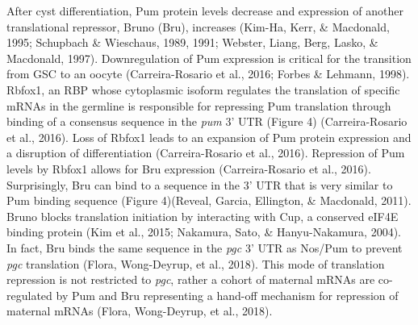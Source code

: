 \documentclass[12pt,oneside]{reedthesis}
\begin{document}
After cyst differentiation, Pum protein levels decrease and expression
of another translational repressor, Bruno (Bru), increases
(Kim-Ha, Kerr, \& Macdonald, 1995; Schupbach \& Wieschaus, 1989, 1991; Webster, Liang, Berg, Lasko, \& Macdonald, 1997). Downregulation of Pum expression is
critical for the transition from GSC to an oocyte
(Carreira-Rosario et al., 2016; Forbes \& Lehmann, 1998). Rbfox1, an RBP whose
cytoplasmic isoform regulates the translation of specific mRNAs in the
germline is responsible for repressing Pum translation through binding
of a consensus sequence in the \emph{pum} 3' UTR (Figure 4)
(Carreira-Rosario et al., 2016). Loss of Rbfox1 leads to an expansion of Pum
protein expression and a disruption of differentiation
(Carreira-Rosario et al., 2016). Repression of Pum levels by Rbfox1 allows
for Bru expression (Carreira-Rosario et al., 2016). Surprisingly, Bru can
bind to a sequence in the 3' UTR that is very similar to Pum binding
sequence (Figure 4)(Reveal, Garcia, Ellington, \& Macdonald, 2011). Bruno blocks translation
initiation by interacting with Cup, a conserved eIF4E binding protein
(Kim et al., 2015; Nakamura, Sato, \& Hanyu-Nakamura, 2004). In fact, Bru binds the same sequence in
the \emph{pgc} 3' UTR as Nos/Pum to prevent \emph{pgc} translation
(Flora, Wong-Deyrup, et al., 2018). This mode of translation repression is not restricted
to \emph{pgc}, rather a cohort of maternal mRNAs are co-regulated by Pum and
Bru representing a hand-off mechanism for repression of maternal mRNAs
(Flora, Wong-Deyrup, et al., 2018).
\end{document}
